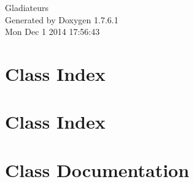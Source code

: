 \documentclass[a4paper]{book}
\begin{document}
\hypersetup{pageanchor=false,citecolor=blue}
\begin{titlepage}
\vspace*{7cm}
\begin{center}
{\Large \-Gladiateurs }\\
\vspace*{1cm}
{\large \-Generated by Doxygen 1.7.6.1}\\
\vspace*{0.5cm}
{\small Mon Dec 1 2014 17:56:43}\\
\end{center}
\end{titlepage}
\clearemptydoublepage
{}
\tableofcontents
\clearemptydoublepage
{}
\hypersetup{pageanchor=true,citecolor=blue}
\chapter{\-Class \-Index}

\chapter{\-Class \-Index}

\chapter{\-Class \-Documentation}



































\printindex
\end{document}
